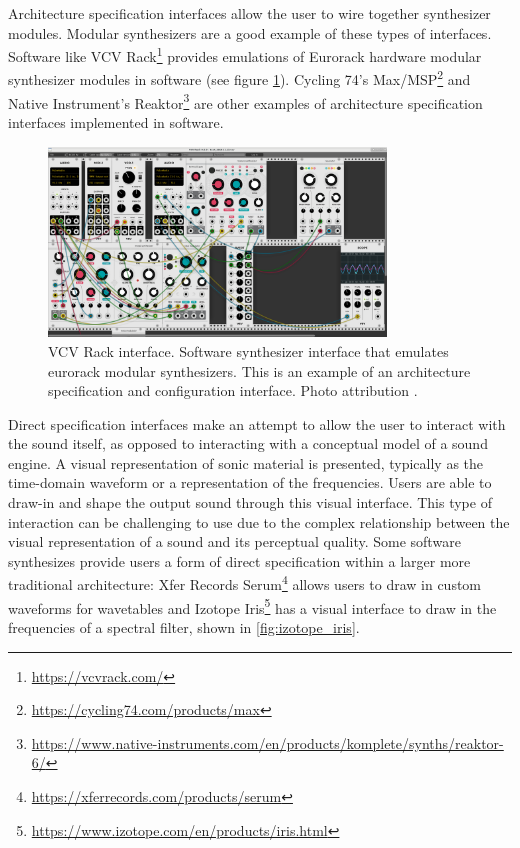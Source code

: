 Architecture specification interfaces allow the user to wire together synthesizer modules. Modular synthesizers are a good example of these types of interfaces. Software like VCV Rack\footnote{\url{https://vcvrack.com/}} provides emulations of Eurorack \cite{intellijel2019} hardware modular synthesizer modules in software (see figure \ref{fig:vcv_rack}). Cycling 74's Max/MSP\footnote{\url{https://cycling74.com/products/max}} and Native Instrument's Reaktor\footnote{\url{https://www.native-instruments.com/en/products/komplete/synths/reaktor-6/}} are other examples of architecture specification interfaces implemented in software.

\begin{figure}[ht]
    \centering
    \includegraphics[width=0.8\textwidth]{figures/background/vcv_rack.png}
    \caption{VCV Rack interface. Software synthesizer interface that emulates eurorack modular synthesizers. This is an example of an architecture specification and configuration interface. Photo attribution \cite{popolon2018vcv}.}
    \label{fig:vcv_rack}
\end{figure}

Direct specification interfaces make an attempt to allow the user to interact with the sound itself, as opposed to interacting with a conceptual model of a sound engine. A visual representation of sonic material is presented, typically as the time-domain waveform or a representation of the frequencies. Users are able to draw-in and shape the output sound through this visual interface. This type of interaction can be challenging to use due to the complex relationship between the visual representation of a sound and its perceptual quality. Some software synthesizes provide users a form of direct specification within a larger more traditional architecture: Xfer Records Serum\footnote{\url{https://xferrecords.com/products/serum}} allows users to draw in custom waveforms for wavetables and Izotope Iris\footnote{\url{https://www.izotope.com/en/products/iris.html}} has a visual interface to draw in the frequencies of a spectral filter, shown in \ref{fig:izotope_iris}. 

